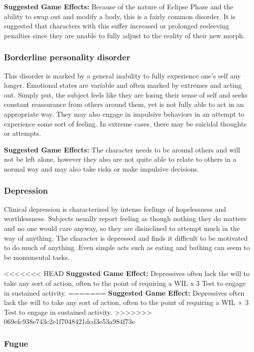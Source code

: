 \textbf{Suggested Game Effects:} Because of the nature of Eclipse Phase and the ability to swap out and modify a body, this is a fairly common disorder. It is suggested that characters with this suffer increased or prolonged resleeving penalties since they are unable to fully adjust to the reality of their new morph.

\subsubsection{Borderline personality disorder}

This disorder is marked by a general inability to fully experience one’s self any longer. Emotional states are variable and often marked by extremes and acting out. Simply put, the subject feels like they are losing their sense of self and seeks constant reassurance from others around them, yet is not fully able to act in an appropriate way. They may also engage in impulsive behaviors in an attempt to experience some sort of feeling. In extreme cases, there may be suicidal thoughts or attempts.

\textbf{Suggested Game Effects:} The character needs to be around others and will not be left alone, however they also are not quite able to relate to others in a normal way and may also take risks or make impulsive decisions.

\subsubsection{Depression}

Clinical depression is characterized by intense feelings of hopelessness and worthlessness. Subjects usually report feeling as though nothing they do matters and no one would care anyway, so they are disinclined to attempt much in the way of anything. The character is depressed and finds it difficult to be motivated to do much of anything. Even simple acts such as eating and bathing can seem to be monumental tasks.

<<<<<<< HEAD
\textbf{Suggested Game Effect:} Depressives often lack the will to take any sort of action, often to the point of requiring a WIL x 3 Test to engage in sustained activity.
=======
\textbf{Suggested Game Effect:} Depressives often lack the will to take any sort of action, often to the point of requiring a WIL $\times$ 3 Test to engage in sustained activity.
>>>>>>> 069efc938e743c2e1f7048421dcd3e53a984f73e

\subsubsection{Fugue}

